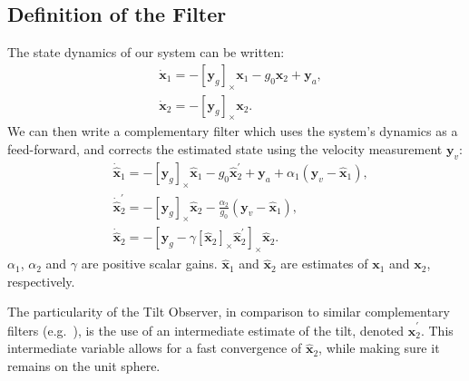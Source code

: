 \documentclass{IJCAS}
\begin{document}
\subsection{Definition of the Filter}
The state dynamics of our system can be written:
\begin{align} 
&\dot{\boldsymbol{x}}_{1} = -\left[\boldsymbol{y}_{g}\right]_{\times} \boldsymbol{x}_{1} - g_{0}\boldsymbol{x}_{2} + \boldsymbol{y}_{a} , \label{eq:x1_dot} \\
&\dot{\boldsymbol{x}}_{2} = -\left[\boldsymbol{y}_{g}\right]_{\times} \boldsymbol{x}_{2}. \label{eq:x2_dot}
\end{align} 
We can then write a complementary filter which uses the system's dynamics as a feed-forward, and corrects the estimated state using the velocity measurement $\boldsymbol{y}_{v}$:
\begin{align} 
& \dot{\hat{\boldsymbol{x}}}_{1}  = - \left[\boldsymbol{y}_{g}\right]_{\times}\hat{\boldsymbol{x}}_{1} - g_{0} \hat{\boldsymbol{x}}_{2}^{\prime} + \boldsymbol{y}_{a} + \alpha_{1} \left(\boldsymbol{y}_{v} - \hat{\boldsymbol{x}}_{1}\right), \label{x1_dot} \\
    & \dot{\hat{\boldsymbol{x}}}_{2}^{\prime} = - \left[\boldsymbol{y}_{g}\right]_{\times} \hat{\boldsymbol{x}}_{2} - \frac{\alpha_{2}}{g_{0}} \left(\boldsymbol{y}_{v} - \hat{\boldsymbol{x}}_{1}\right), \\
    & \dot{\hat{\boldsymbol{x}}}_{2} = - \left[\boldsymbol{y}_{g} - \gamma \left[\hat{\boldsymbol{x}}_{2}\right]_{\times}\hat{\boldsymbol{x}}_{2}^{\prime}\right]_{\times} \hat{\boldsymbol{x}}_{2}.
\end{align} 
$\alpha_1$, $\alpha_2$ and $\gamma$ are positive scalar gains. $\hat{\boldsymbol{x}}_{1} $ and $\hat{\boldsymbol{x}}_{2} $ are estimates of $\boldsymbol{x}_{1} $ and $\boldsymbol{x}_{2} $, respectively. 

The particularity of the Tilt Observer, in comparison to similar complementary filters (e.g.~\cite{martin2016AGlobExpObsVelocityAidedAttitude}), is the use of an intermediate estimate of the tilt, denoted $\hat{\boldsymbol{x}}_{2}^{\prime}$. This intermediate variable allows for a fast convergence of $\hat{\boldsymbol{x}}_{2}$, while making sure it remains on the unit sphere. 
\end{document}
